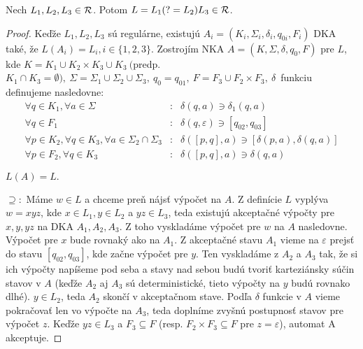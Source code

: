 \begin{veta} \label{lookahead+R}
Nech $ L_{1}, L_{2}, L_{3} \in {\cal R} $. Potom $ L = L_{1}(?=L_{2})L_{3} \in {\cal R} $.
\end{veta}
\begin{proof}
Keďže $ L_{1},L_{2},L_{3} $ sú regulárne, existujú $ A_{i} = (K_{i},\Sigma_{i},\delta_{i},q_{0i},F_{i}) $ DKA také, že $ L(A_{i})=L_{i}, i \in \lbrace 1,2,3\rbrace $. Zostrojím NKA $ A = (K,\Sigma,\delta,q_{0},F) $ pre $L$, kde
$ K = K_{1} \cup K_{2} \times K_{3} \cup K_{3} ~ ( $predp. $ K_{1} \cap K_{3}= \emptyset), ~
\Sigma=\Sigma_{1}\cup\Sigma_{2}\cup\Sigma_{3}, ~ q_{0}=q_{01}, ~ F = F_{3} \cup F_{2} \times F_{3}, ~ \delta $~funkciu definujeme nasledovne:
\begin{eqnarray*}
\forall q \in K_{1}, \forall a \in \Sigma &:& \delta(q,a) \ni \delta_{1}(q,a) \\
\forall q \in F_{1} &:& \delta(q,\varepsilon ) \ni \left[ q_{02},q_{03} \right] \\
\forall p \in K_{2}, \forall q \in K_{3}, \forall a \in \Sigma_{2} \cap \Sigma_{3} &:& \delta( \left[ p,q \right] ,a) \ni \left[ \delta(p,a), \delta (q,a) \right] \\
\forall p \in F_2, \forall q \in K_3 &:& \delta(\left[p,q\right],a) \ni \delta(q,a) 
\end{eqnarray*}

$ L(A) = L. $

$ \supseteq: $ Máme $ w \in L $ a chceme preň nájsť výpočet na $A$. Z definície $L$ vyplýva $w=xyz$, kde $x \in L_1, y \in L_2$ a $yz \in L_3$, teda existujú akceptačné výpočty pre $x,y,yz$ na DKA $A_1,A_2,A_3$. Z toho vyskladáme výpočet pre $w$ na $A$ nasledovne. Výpočet pre $x$ bude rovnaký ako na $A_1$. Z akceptačné stavu $A_1$ vieme na $\varepsilon$ prejsť do stavu $\left[q_{02},q_{03}\right]$, kde začne výpočet pre $y$. Ten vyskladáme z $A_2$ a $A_3$ tak, že si ich výpočty napíšeme pod seba a stavy nad sebou budú tvoriť karteziánsky súčin stavov v $A$ (keďže $A_2$ aj $A_3$ sú deterministické, tieto výpočty na $y$ budú rovnako dlhé). $y \in L_2$, teda $A_2$ skončí v akceptačnom stave. Podľa $\delta$ funkcie v $A$ vieme pokračovať len vo výpočte na $A_3$, teda doplníme zvyšnú postupnosť stavov pre výpočet $z$. Keďže $yz \in L_3$ a $F_3\subseteq F$ (resp. $F_2\times F_3\subseteq F$ pre $z=\varepsilon$), automat A akceptuje. 


\end{proof}
